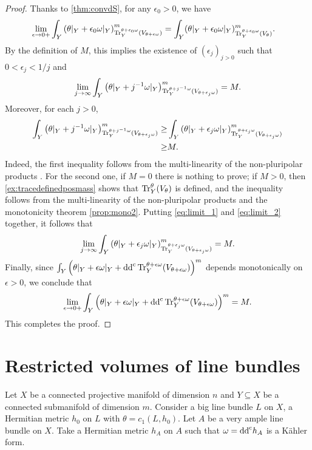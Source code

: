 \begin{proof}
Thanks to \cref{thm:convdS}, for any $\epsilon_0>0$, we have
\[
\begin{aligned}
\lim_{\epsilon\to 0+}\int_Y \left(\theta|_Y + \epsilon_0 \omega|_Y\right)^m_{\operatorname{Tr}_Y^{\theta + \epsilon_0 \omega}(V_{\theta + \epsilon \omega})}
&= \int_Y (\theta|_Y + \epsilon_0 \omega|_Y)^m_{\operatorname{Tr}_Y^{\theta + \epsilon_0 \omega}(V_{\theta})}.
\end{aligned}
\]
By the definition of $M$, this implies the existence of $(\epsilon_j)_{j>0}$ such that $0<\epsilon_j<1/j$ and
\begin{equation}\label{eq:limit_1}
\lim_{j\to\infty}\int_Y \left(\theta|_Y + j^{-1}\omega|_Y\right)^m_{\operatorname{Tr}_Y^{\theta + j^{-1} \omega}(V_{\theta + \epsilon_j \omega}) } = M.
\end{equation}
Moreover, for each $j>0$,
\begin{equation}\label{eq:limit_2}
\begin{aligned}
\int_Y \left(\theta|_Y + j^{-1} \omega|_Y\right)^m_{\operatorname{Tr}_Y^{\theta + j^{-1} \omega}(V_{\theta + \epsilon_j \omega}) } \geq & \int_Y \left(\theta|_Y + \epsilon_j \omega|_Y\right)^m_{\operatorname{Tr}_Y^{\theta + \epsilon_j\omega}(V_{\theta + \epsilon_j \omega}) } \\
\geq & M.
\end{aligned}
\end{equation}
Indeed, the first inequality follows from the multi-linearity of the non-pluripolar products . For the second one, if $M=0$ there is nothing to prove; if $M>0$, then \cref{ex:tracedefinedposmass} shows that $\operatorname{Tr}_Y^\theta(V_\theta)$ is defined, and the inequality follows from the multi-linearity of the non-pluripolar products  and the monotonicity theorem \cref{prop:mono2}.
Putting \eqref{eq:limit_1} and \eqref{eq:limit_2} together, it follows that
\[
\lim_{j\to\infty}\int_Y \left(\theta|_Y + \epsilon_j \omega|_Y\right)^m_{\operatorname{Tr}_Y^{\theta + \epsilon_j \omega}(V_{\theta + \epsilon_j \omega}) } = M.
\]
Finally, since $\int_Y \left(\theta|_Y + \epsilon \omega|_Y +  \mathrm{dd}^{\mathrm{c}} \operatorname{Tr}_Y^{\theta+ \epsilon \omega}(V_{\theta+ \epsilon \omega}) \right)^m$ depends monotonically on $\epsilon>0$, we conclude that
\[
\lim_{\epsilon\to 0+}\int_Y \left(\theta|_Y + \epsilon \omega|_Y +  \mathrm{dd}^{\mathrm{c}} \operatorname{Tr}_Y^{\theta+ \epsilon \omega}(V_{\theta+ \epsilon \omega}) \right)^m=M.
\]
This completes the proof.
\end{proof}



\section{Restricted volumes of line bundles}\label{sec:resvol}
Let $X$ be a connected projective manifold of dimension $n$ and $Y\subseteq X$ be a connected submanifold of dimension $m$. Consider a big line bundle $L$ on $X$, a Hermitian metric $h_0$ on $L$ with $\theta=c_1(L,h_0)$.
Let $A$ be a very ample line bundle on $X$. Take a Hermitian metric $h_A$ on $A$ such that $\omega=\mathrm{dd}^{\mathrm{c}} h_A$ is a Kähler form.


